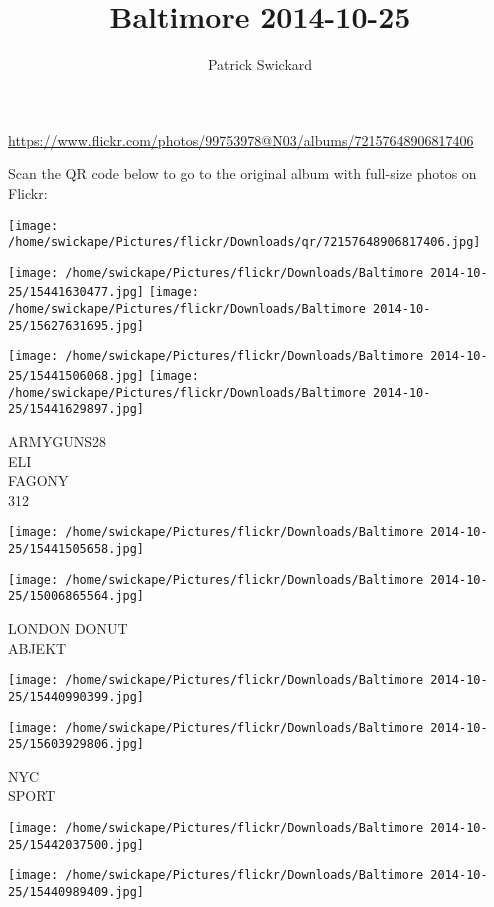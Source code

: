 \documentclass[10pt,letterpaper]{article}
\title{Baltimore 2014-10-25}
\author{Patrick Swickard}
\date{}
\begin{document}
\maketitle

\url{https://www.flickr.com/photos/99753978@N03/albums/72157648906817406}

Scan the QR code below to go to the original album with full-size photos on Flickr:

\texttt{[image: /home/swickape/Pictures/flickr/Downloads/qr/72157648906817406.jpg]}
\pagebreak

\texttt{[image: /home/swickape/Pictures/flickr/Downloads/Baltimore 2014-10-25/15441630477.jpg]}
\texttt{[image: /home/swickape/Pictures/flickr/Downloads/Baltimore 2014-10-25/15627631695.jpg]}

\texttt{[image: /home/swickape/Pictures/flickr/Downloads/Baltimore 2014-10-25/15441506068.jpg]}
\texttt{[image: /home/swickape/Pictures/flickr/Downloads/Baltimore 2014-10-25/15441629897.jpg]}

ARMYGUNS28\\
ELI\\
FAGONY\\
312
\pagebreak

\texttt{[image: /home/swickape/Pictures/flickr/Downloads/Baltimore 2014-10-25/15441505658.jpg]}

\vspace{0.25in}
\texttt{[image: /home/swickape/Pictures/flickr/Downloads/Baltimore 2014-10-25/15006865564.jpg]}

LONDON DONUT\\
ABJEKT
\pagebreak

\texttt{[image: /home/swickape/Pictures/flickr/Downloads/Baltimore 2014-10-25/15440990399.jpg]}

\vspace{0.25in}
\texttt{[image: /home/swickape/Pictures/flickr/Downloads/Baltimore 2014-10-25/15603929806.jpg]}

NYC\\
SPORT
\pagebreak

\texttt{[image: /home/swickape/Pictures/flickr/Downloads/Baltimore 2014-10-25/15442037500.jpg]}

\vspace{0.25in}
\texttt{[image: /home/swickape/Pictures/flickr/Downloads/Baltimore 2014-10-25/15440989409.jpg]}
\end{document}

